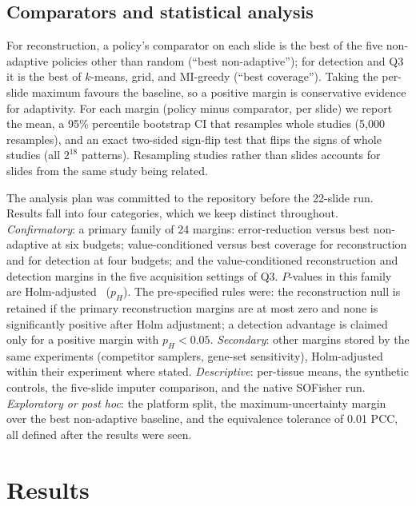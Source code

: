 \documentclass{article}
\begin{document}
\subsection{Comparators and statistical analysis}
For reconstruction, a policy's comparator on each slide is the best of the five non-adaptive policies other
than random (``best non-adaptive''); for detection and Q3 it is the best of $k$-means, grid, and MI-greedy
(``best coverage''). Taking the per-slide maximum favours the baseline, so a positive margin is conservative
evidence for adaptivity. For each margin (policy minus comparator, per slide) we report the mean, a 95\%
percentile bootstrap CI that resamples whole studies (5{,}000 resamples), and an exact two-sided sign-flip
test that flips the signs of whole studies (all $2^{18}$ patterns). Resampling studies rather than slides
accounts for slides from the same study being related.

The analysis plan was committed to the repository before the 22-slide run. Results fall into four categories,
which we keep distinct throughout.
\emph{Confirmatory}: a primary family of 24 margins: error-reduction versus best non-adaptive at six budgets;
value-conditioned versus best coverage for reconstruction and for detection at four budgets; and the
value-conditioned reconstruction and detection margins in the five acquisition settings of Q3. $P$-values in
this family are Holm-adjusted~\citep{holm1979simple} ($p_H$). The pre-specified rules were: the reconstruction
null is retained if the primary reconstruction margins are at most zero and none is significantly positive
after Holm adjustment; a detection advantage is claimed only for a positive margin with $p_H<0.05$.
\emph{Secondary}: other margins stored by the same experiments (competitor samplers, gene-set sensitivity),
Holm-adjusted within their experiment where stated.
\emph{Descriptive}: per-tissue means, the synthetic controls, the five-slide imputer comparison, and the native
SOFisher run.
\emph{Exploratory or post hoc}: the platform split, the maximum-uncertainty margin over the best non-adaptive
baseline, and the equivalence tolerance of 0.01 PCC, all defined after the results were seen.

\section{Results}
\end{document}
